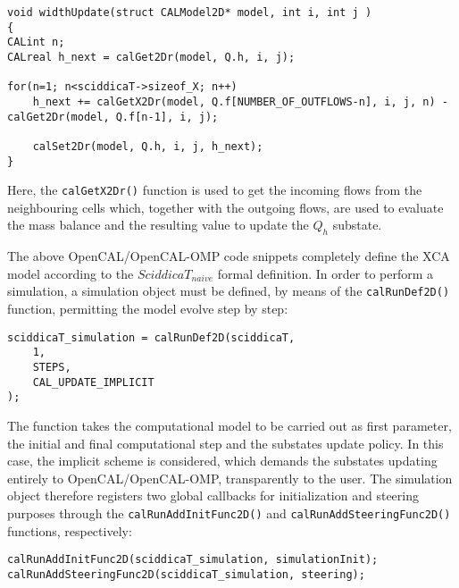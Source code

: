 \begin{lstlisting}
void widthUpdate(struct CALModel2D* model, int i, int j )
{
CALint n;
CALreal h_next = calGet2Dr(model, Q.h, i, j);

for(n=1; n<sciddicaT->sizeof_X; n++)
	h_next += calGetX2Dr(model, Q.f[NUMBER_OF_OUTFLOWS-n], i, j, n) - calGet2Dr(model, Q.f[n-1], i, j);

	calSet2Dr(model, Q.h, i, j, h_next);
}
\end{lstlisting}

\noindent Here, the \verb'calGetX2Dr()' function is used to get the
incoming flows from the neighbouring cells which, together with the
outgoing flows, are used to evaluate the mass balance and the
resulting value to update the $Q_h$ substate.

The above OpenCAL/OpenCAL-OMP code snippets completely define the
XCA model according to the $SciddicaT_{naive}$ formal definition. In
order to perform a simulation, a simulation object must be defined,
by means of the \verb'calRunDef2D()' function, permitting the model
evolve step by step:

\begin{lstlisting}
sciddicaT_simulation = calRunDef2D(sciddicaT,
	1,
	STEPS,
	CAL_UPDATE_IMPLICIT
);
\end{lstlisting}

\noindent The function takes the computational model to be carried out as
first parameter, the initial and final computational step and the
substates update policy. In this case, the implicit scheme is
considered, which demands the substates updating entirely to
OpenCAL/OpenCAL-OMP, transparently to the user. The simulation
object therefore registers two global callbacks for initialization
and steering purposes through the \verb'calRunAddInitFunc2D()' and
\verb'calRunAddSteeringFunc2D()' functions, respectively:

\begin{lstlisting}
calRunAddInitFunc2D(sciddicaT_simulation, simulationInit);
calRunAddSteeringFunc2D(sciddicaT_simulation, steering);
\end{lstlisting}

